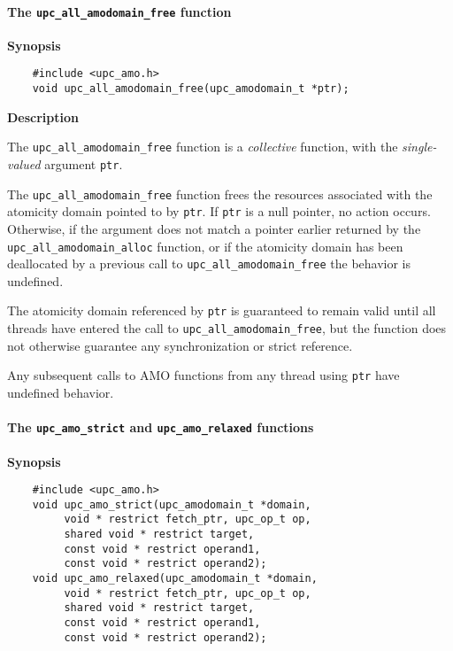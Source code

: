 \paragraph{The {\tt upc\_all\_amodomain\_free} function}

{\bf Synopsis}

\npf\vspace{-1.8em}
\begin{verbatim}
    #include <upc_amo.h>
    void upc_all_amodomain_free(upc_amodomain_t *ptr);
\end{verbatim}

{\bf Description}

\np The {\tt upc\_all\_amodomain\_free} function is a {\em collective} function,
    with the {\em single-valued} argument {\tt ptr}.

\np The {\tt upc\_all\_amodomain\_free} function frees the resources associated with
    the atomicity domain pointed to by {\tt ptr}.  If {\tt ptr} is a null pointer,
    no action occurs.  Otherwise, if the argument does not match a pointer
    earlier returned by the {\tt upc\_all\_amodomain\_alloc} function, or if
    the atomicity domain has been deallocated by a previous call to
    {\tt upc\_all\_amodomain\_free} the behavior is undefined.

\np The atomicity domain referenced by {\tt ptr} is guaranteed to remain valid
    until all threads have entered the call to {\tt upc\_all\_amodomain\_free},
    but the function does not otherwise guarantee any synchronization or
    strict reference.

\np Any subsequent calls to AMO functions from any thread using {\tt ptr} have
    undefined behavior.

\paragraph{The {\tt upc\_amo\_strict} and {\tt upc\_amo\_relaxed} functions}

{\bf Synopsis}

\npf\vspace{-1.8em}
\begin{verbatim}
    #include <upc_amo.h>
    void upc_amo_strict(upc_amodomain_t *domain,
         void * restrict fetch_ptr, upc_op_t op,
         shared void * restrict target,
         const void * restrict operand1,
         const void * restrict operand2);
    void upc_amo_relaxed(upc_amodomain_t *domain,
         void * restrict fetch_ptr, upc_op_t op,
         shared void * restrict target,
         const void * restrict operand1,
         const void * restrict operand2);
\end{verbatim}


